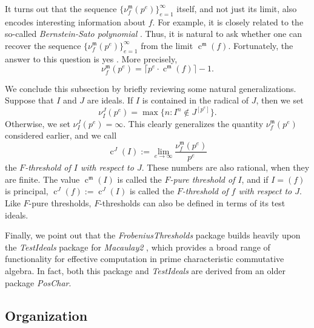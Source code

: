 \documentclass{amsart}
\newcommand{\ft}{\operatorname{c}}
\newcommand{\idealm}{\mathfrak{m}}
\begin{document}
It turns out that the sequence $\{ \nu_f^{\idealm}(p^e) \}_{e=1}^{\infty}$ itself, and not just its limit, also encodes interesting information about $f$.  For example, it is closely related to the so-called \emph{Bernstein-Sato polynomial} \cite{MustataTakagiWatanabeFThresholdsAndBernsteinSato}.  Thus, it is natural to ask whether one can recover the sequence $\{ \nu_f^{\idealm}(p^e) \}_{e=1}^{\infty}$ from the limit $\ft^{\idealm}(f)$.  Fortunately, the answer to this question is yes \cite{MustataTakagiWatanabeFThresholdsAndBernsteinSato, HernandezFPurityOfHypersurfaces}. More precisely,
\begin{equation*}
\nu_f^{\idealm}(p^e) = \lceil p^e \cdot \ft^{\idealm}(f) \rceil - 1.
\end{equation*}

We conclude this subsection by briefly reviewing some natural generalizations.  Suppose that $I$ and $J$ are ideals.  If $I$ is contained in the radical of $J$, then we set
%
\[ \nu_I^J(p^e) = \max \{ n : I^n \notin J^{[p^e]} \}. \]
Otherwise, we set $\nu_I^J(p^e) = \infty$.
This clearly generalizes the quantity $\nu_f^{\idealm}(p^e)$ considered earlier, and we call
\[ \ft^J(I) := \lim_{e \to \infty} \frac{ \nu_f^{\idealm}(p^e)}{p^e} \]
the \emph{$F$-threshold of $I$ with respect to $J$}.  These numbers are also rational, when they are finite.
The value $\ft^{\idealm}(I)$ is called the \emph{$F$-pure threshold of $I$}, and if $I = (f)$ is principal,  $\ft^{J}(f) := \ft^J(I)$ is called the \emph{$F$-threshold of $f$ with respect to $J$}.
Like $F$-pure thresholds, $F$-thresholds can also be defined in terms of its test ideals.

Finally, we point out that the  \emph{FrobeniusThresholds} package builds heavily upon the \emph{TestIdeals} package for \emph{Macaulay2} \cite{TestIdealsPackage, TestIdealsPaper,M2}, which provides a broad range of functionality for effective computation in prime characteristic commutative algebra.  In fact, both this package and \emph{TestIdeals} are derived from an older package \emph{PosChar}.

\subsection*{Organization}
\end{document}
